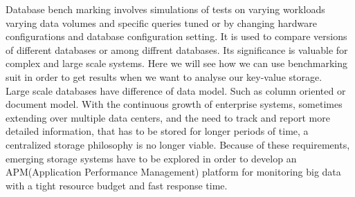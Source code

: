 \documentclass{bigdata}
\begin{document}
Database bench marking involves simulations of tests on varying workloads  varying data volumes and specific queries tuned or by changing hardware configurations and database configuration setting. It is used to compare versions of different databases or among diffrent databases. Its significance is valuable for complex and large scale systems. Here we will see how we can use benchmarking suit in order to get results when we want to analyse our key-value storage.\\

Large scale databases have difference of data model. Such as column oriented or document model. With the continuous growth of enterprise systems, sometimes extending over multiple data centers, and the need to track and report more detailed information, that has to be stored for longer periods of time, a centralized storage philosophy is no longer viable. \cite{g} Because of these requirements, emerging storage systems have to be explored in order to develop an APM(Application Performance Management) platform for monitoring big data with a tight resource budget and fast response time. \\
\end{document}
